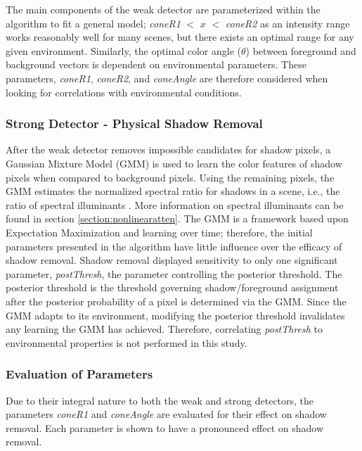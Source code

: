The main components of the weak detector are parameterized within the algorithm to fit a general model; \textit{coneR1} $<$ $x$ $<$ \textit{coneR2} as an intensity range works reasonably well for many scenes, but there exists an optimal range for any given environment. Similarly, the optimal color angle ($\theta$) between foreground and background vectors is dependent on environmental parameters. These parameters, \textit{coneR1}, \textit{coneR2}, and \textit{coneAngle} are therefore considered when looking for correlations with environmental conditions.

\FloatBarrier
\subsubsection{Strong Detector - Physical Shadow Removal}

After the weak detector removes impossible candidates for shadow pixels, a Gaussian Mixture Model (GMM) is used to learn the color features of shadow pixels when compared to background pixels. Using the remaining pixels, the GMM estimates the normalized spectral ratio for shadows in a scene, i.e., the ratio of spectral illuminants \cite{huang2009moving, sato2015foreground, lee2017shadow}. More information on spectral illuminants can be found in section \ref{section:nonlinearatten}. The GMM is a framework based upon Expectation Maximization and learning over time; therefore, the initial parameters presented in the algorithm have little influence over the efficacy of shadow removal. Shadow removal displayed sensitivity to only one significant parameter, \textit{postThresh}, the parameter controlling the posterior threshold. The posterior threshold is the threshold governing shadow/foreground assignment after the posterior probability of a pixel is determined via the GMM. Since the GMM adapts to its environment, modifying the posterior threshold invalidates any learning the GMM has achieved. Therefore, correlating \textit{postThresh} to environmental properties is not performed in this study.

\subsubsection{Evaluation of Parameters}

Due to their integral nature to both the weak and strong detectors, the parameters \textit{coneR1} and \textit{coneAngle} are evaluated for their effect on shadow removal. Each parameter is shown to have a pronounced effect on shadow removal. 

